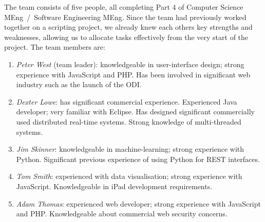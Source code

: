 The team consists of five people, all completing Part 4 of Computer Science MEng~/~Software Engineering MEng. Since the team had previously worked together on a scripting project, we already knew each others key strengths and weaknesses, allowing us to allocate tasks effectively from the very start of the project. The team members are:
\begin{enumerate}
\item \textit{Peter West} (team leader): knowledgeable in user-interface design; strong experience with JavaScript and PHP. Has been involved in significant web industry such as the launch of the ODI.
\item \textit{Dexter Lowe}: has significant commercial experience. Experienced Java developer; very familiar with Eclipse. Has designed significant commercially used distributed real-time systems. Strong knowledge of multi-threaded systems. 
\item \textit{Jim Skinner}: knowledgeable in machine-learning; strong experience with Python. Significant previous experience of using Python for REST interfaces.
\item \textit{Tom Smith}: experienced with data visualisation; strong experience with JavaScript. Knowledgeable in iPad development requirements.
\item \textit{Adam Thomas}: experienced web developer; strong experience with JavaScript and PHP. Knowledgeable about commercial web security concerns.
\end{enumerate}

